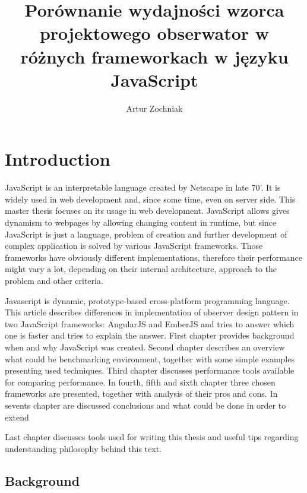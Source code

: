 \documentclass[inzynier,druk,ramka]{build/dyplom}
\author{Artur Zochniak}
\title{Porównanie wydajności wzorca projektowego obserwator w różnych frameworkach w języku JavaScript}
\begin{document}
\maketitle




% 



\chapter{Introduction}
JavaScript is an interpretable language created by Netscape in late 70’. It is widely used in web development and, since some time, even on server side. This master thesis focuses on its usage in web development. JavaScript allows gives dynamism to webpages by allowing changing content in runtime, but since JavaScript is just a language, problem of creation and further development of complex application is solved by various JavaScript frameworks. Those frameworks have obviously different implementations, therefore their performance might vary a lot, depending on their internal architecture, approach to the problem and other criteria.

Javascript is dynamic, prototype-based cross-platform programming language.
This article describes differences in implementation of observer design pattern in two JavaScript frameworks: AngularJS and EmberJS and tries to answer which one is faster and tries to explain the answer.
First chapter provides background when and why JavaScript was created.
Second chapter describes an overview what could be benchmarking environment, together with some simple examples presenting used techniques.
Third chapter discusses performance tools available for comparing performance.
In fourth, fifth and sixth chapter three chosen frameworks are presented, together with analysis of their pros and cons.
In sevents chapter are discussed conclusions and what could be done in order to extend

Last chapter discusses tools used for writing this thesis and useful tips regarding understanding philosophy behind this text.

\section{Background}
\end{document}
